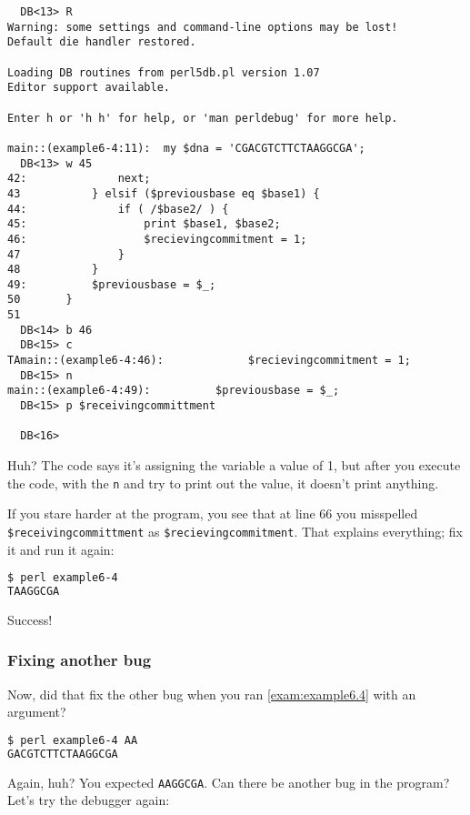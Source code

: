 \begin{lstlisting}
  DB<13> R
Warning: some settings and command-line options may be lost!
Default die handler restored.

Loading DB routines from perl5db.pl version 1.07
Editor support available.

Enter h or 'h h' for help, or 'man perldebug' for more help.

main::(example6-4:11):	my $dna = 'CGACGTCTTCTAAGGCGA';
  DB<13> w 45
42:              next;
43           } elsif ($previousbase eq $base1) {
44:              if ( /$base2/ ) {
45:                  print $base1, $base2; 
46:                  $recievingcommitment = 1;
47               }
48           }
49:          $previousbase = $_;
50       }
51
  DB<14> b 46
  DB<15> c
TAmain::(example6-4:46):             $recievingcommitment = 1;
  DB<15> n
main::(example6-4:49):          $previousbase = $_;
  DB<15> p $receivingcommittment

  DB<16> 
\end{lstlisting}

Huh? The code says it's assigning the variable a value of 1, but after you execute the code, with the \verb|n| and try to print out the value, it doesn't print anything.

If you stare harder at the program, you see that at line 66 you misspelled \verb|$receivingcommittment| as \verb|$recievingcommitment|. That explains everything; fix it and run it again:

\begin{lstlisting}[language=bash]
$ perl example6-4
TAAGGCGA 
\end{lstlisting}

Success! 

\subsubsection{Fixing another bug}
Now, did that fix the other bug when you ran \autoref{exam:example6.4} with an argument?

\begin{lstlisting}[language=bash]
$ perl example6-4 AA
GACGTCTTCTAAGGCGA
\end{lstlisting}

Again, huh? You expected \verb|AAGGCGA|. Can there be another bug in the program? Let's try the debugger again:

